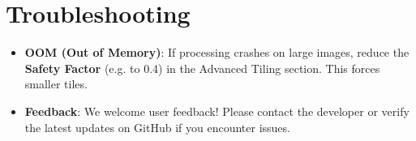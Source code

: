 \documentclass[a4paper,12pt]{article}
\begin{document}
\section{Troubleshooting}
\begin{itemize}
    \item \textbf{OOM (Out of Memory)}: If processing crashes on large images, reduce the \textbf{Safety Factor} (e.g. to 0.4) in the Advanced Tiling section. This forces smaller tiles.
    \item \textbf{Feedback}: We welcome user feedback! Please contact the developer or verify the latest updates on GitHub if you encounter issues.
\end{itemize}
\end{document}

